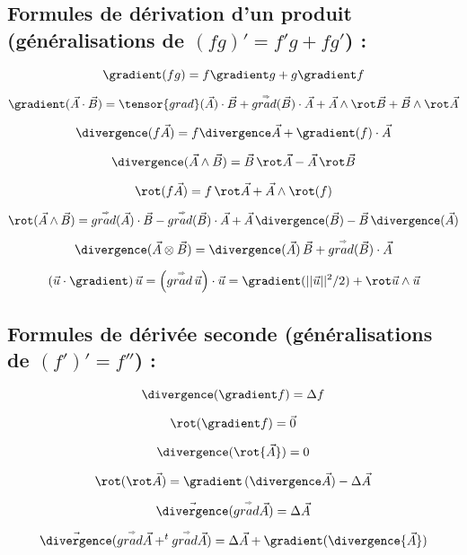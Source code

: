 \subsection{ Formules de dérivation d'un produit  (généralisations de $(fg)' = f'g + fg'$) :}


$$
\gradient ( fg) = f \gradient g + g \gradient f
$$

$$
\gradient ( \vec{A} \cdot \vec{B} ) = 
\tensor{grad}( \vec{A} ) \cdot \vec{B}
+
\mytensor{grad}( \vec{B} ) \cdot \vec{A}
+
\vec{A} \wedge \rot \vec{B} +  \vec{B} \wedge \rot \vec{A}
$$

$$
\divergence(f \vec{A} ) = f \divergence \vec{A} + \gradient (f) \cdot \vec{A}
$$

$$
\divergence(\vec{A} \wedge \vec{B} ) = \vec{B} \, \rot  \vec{A} 
-\vec{A} \, \rot \vec{B}
$$

$$
\rot ( f \vec{A} ) = f \, \rot \vec{A} + \vec{A} \wedge \rot (f)
$$

$$
\rot ( \vec{A}  \wedge \vec{B} ) = \mytensor{grad}( \vec{A} ) \cdot \vec{B}
-
\mytensor{grad}( \vec{B} ) \cdot \vec{A}
+
\vec{A} \, \divergence (\vec{B}) -  \vec{B} \, \divergence( \vec{A})
$$

$$
\divergence ( \vec{A} \otimes \vec{B} ) = \divergence (\vec{A}) \, \vec{B} 
+\mytensor{grad}( \vec{B} ) \cdot \vec{A}
 $$

$$
\left( \vec{u} \cdot \gradient \right)  \vec{u} 
= \left( \mytensor{grad} \, \vec{u} \right) \cdot \vec{u}
= \gradient ( ||\vec{u}||^2 /2 ) + \rot \vec{u} \wedge \vec{u}
$$ 




\subsection{Formules de dérivée seconde (généralisations de $(f')' = f''$) :}

$$
\divergence (\gradient  f) = \Delta f 
$$

$$
\rot (\gradient  f) = \vec{0} 
$$


$$
\divergence ( \rot {\vec A} ) = 0
$$

$$
 \rot (\rot \vec{A}  )  = \gradient \, (\divergence \vec{A})  - \Delta \vec{A}
$$


$$
\vec{\divergence} (\mytensor{grad}  \vec{A}) = \Delta  {\vec A}
$$

$$
\vec{\divergence} (\mytensor{grad}  \vec{A}+ ^t\mytensor{grad}  \vec{A}) = \Delta  {\vec A} + \gradient (\divergence{\vec{A}}) 
$$



